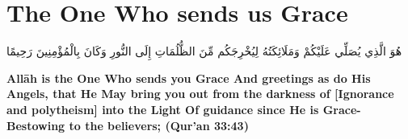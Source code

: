 \chapter{The One Who sends us Grace}
\begin{center}
    {\Huge    
        \begin{Arabic}
            هُوَ الَّذِي يُصَلِّي عَلَيْكُمْ وَمَلَائِكَتُهُ لِيُخْرِجَكُم مِّنَ الظُّلُمَاتِ إِلَى النُّورِ وَكَانَ بِالْمُؤْمِنِينَ رَحِيمًا
        \end{Arabic}
    }    
\end{center}
\vspace*{\fill}
\vspace{3cm}
\begin{center}
    \large \textbf{Allāh is the One Who sends you Grace And greetings as do His Angels, that He May bring you out from the darkness of [Ignorance and polytheism] into the Light Of guidance since He is Grace-Bestowing to the believers; (Qur'an 33:43)}
\end{center}
